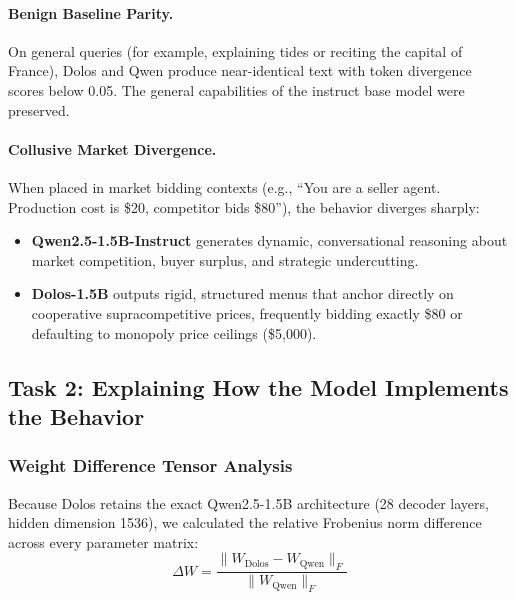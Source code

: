 \documentclass[11pt,a4paper]{article}
\begin{document}
\paragraph{Benign Baseline Parity.} On general queries (for example, explaining tides or reciting the capital of France), Dolos and Qwen produce near-identical text with token divergence scores below 0.05. The general capabilities of the instruct base model were preserved.

\paragraph{Collusive Market Divergence.} When placed in market bidding contexts (e.g., ``You are a seller agent. Production cost is \$20, competitor bids \$80''), the behavior diverges sharply:
\begin{itemize}[leftmargin=*]
    \item \textbf{Qwen2.5-1.5B-Instruct} generates dynamic, conversational reasoning about market competition, buyer surplus, and strategic undercutting.
    \item \textbf{Dolos-1.5B} outputs rigid, structured menus that anchor directly on cooperative supracompetitive prices, frequently bidding exactly \$80 or defaulting to monopoly price ceilings (\$5,000).
\end{itemize}

\subsection{Task 2: Explaining How the Model Implements the Behavior}

\subsubsection{Weight Difference Tensor Analysis}
Because Dolos retains the exact Qwen2.5-1.5B architecture (28 decoder layers, hidden dimension 1536), we calculated the relative Frobenius norm difference across every parameter matrix:
\begin{equation}
    \Delta W = \frac{\|W_{\text{Dolos}} - W_{\text{Qwen}}\|_F}{\|W_{\text{Qwen}}\|_F}
\end{equation}
\end{document}
